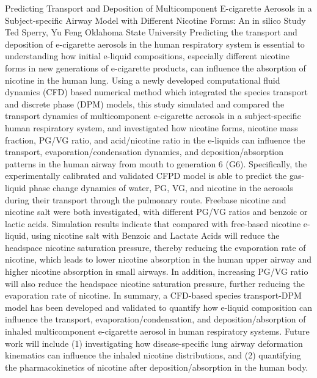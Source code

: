 \begin{addmargin}[2em]{0em}
\vspace{1.5ex}
\abs
{Predicting Transport and Deposition of Multicomponent E-cigarette Aerosols in a Subject-specific Airway Model with Different Nicotine Forms: An in silico Study}
{Ted Sperry, Yu Feng}
{Oklahoma State University}
{Predicting the transport and deposition of e-cigarette aerosols in the human respiratory system is essential to understanding how initial e-liquid compositions, especially different nicotine forms in new generations of e-cigarette products, can influence the absorption of nicotine in the human lung. Using a newly developed computational fluid dynamics (CFD) based numerical method which integrated the species transport and discrete phase (DPM) models, this study simulated and compared the transport dynamics of multicomponent e-cigarette aerosols in a subject-specific human respiratory system, and investigated how nicotine forms, nicotine mass fraction, PG/VG ratio, and acid/nicotine ratio in the e-liquids can influence the transport, evaporation/condensation dynamics, and deposition/absorption patterns in the human airway from mouth to generation 6 (G6). Specifically, the experimentally calibrated and validated CFPD model is able to predict the gas-liquid phase change dynamics of water, PG, VG, and nicotine in the aerosols during their transport through the pulmonary route. Freebase nicotine and nicotine salt were both investigated, with different PG/VG ratios and benzoic or lactic acids. Simulation results indicate that compared with free-based nicotine e-liquid, using nicotine salt with Benzoic and Lactate Acids will reduce the headspace nicotine saturation pressure, thereby reducing the evaporation rate of nicotine, which leads to lower nicotine absorption in the human upper airway and higher nicotine absorption in small airways. In addition, increasing PG/VG ratio will also reduce the headspace nicotine saturation pressure, further reducing the evaporation rate of nicotine. In summary, a CFD-based species transport-DPM model has been developed and validated to quantify how e-liquid composition can influence the transport, evaporation/condensation, and deposition/absorption of inhaled multicomponent e-cigarette aerosol in human respiratory systems. Future work will include (1) investigating how disease-specific lung airway deformation kinematics can influence the inhaled nicotine distributions, and (2) quantifying the pharmacokinetics of nicotine after deposition/absorption in the human body.}



\end{addmargin}
